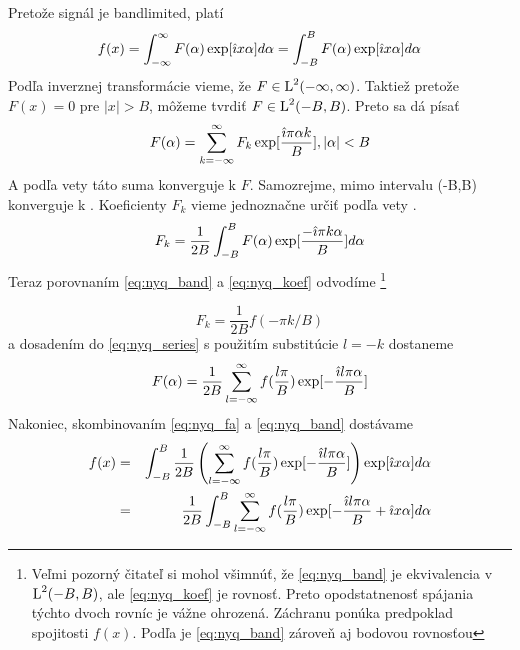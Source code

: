 \begin{dokaz}
    Pretože signál je bandlimited, platí
    \begin{equation}
        f(x) = \int_{-\infty}^{\infty} F(\alpha) \exp[ \hat{\imath} x \alpha]
        d\alpha = \int_{-B}^{B} F(\alpha) \exp[ \hat{\imath} x \alpha]
        d\alpha
        \label{eq:nyq_band}
    \end{equation}
    Podľa inverznej transformácie vieme, že $F \in \mbox{L}^2(-\infty,\infty)$. Taktiež
    pretože $F(x) = 0$ pre $|x| > B$, môžeme tvrdiť $F \in \mbox{L}^2(-B,B)$.
    Preto sa dá písať    
    \begin{equation}
        F(\alpha) = \sum_{k=-\infty}^{\infty} F_k \exp[\frac{\hat{\imath} \pi
        \alpha k}{B}], |\alpha|<B
        \label{eq:nyq_series}
    \end{equation}
    A podľa vety \todo{} táto suma konverguje k $F$. 
    Samozrejme, mimo intervalu (-B,B) konverguje k .
    Koeficienty $F_k$ vieme jednoznačne určiť podľa vety \todo{}.
    \begin{equation}
        F_k = \frac{1}{2B} \int_{-B}^{B} F(\alpha) \exp[\frac{- \hat{\imath}
        \pi k \alpha}{B}] d\alpha
        \label{eq:nyq_koef}
    \end{equation}
    Teraz porovnaním \ref{eq:nyq_band} a \ref{eq:nyq_koef} odvodíme        
    \footnote{Veľmi pozorný čitateľ si mohol všimnúť, že
        \ref{eq:nyq_band} je ekvivalencia v $\mbox{L}^2(-B,B)$, ale
        \ref{eq:nyq_koef} je rovnosť. Preto
        opodstatnenosť spájania týchto dvoch rovníc je vážne ohrozená.
        Záchranu ponúka predpoklad spojitosti $f(x)$. Podľa \todo{} je
        \ref{eq:nyq_band} zároveň aj bodovou rovnosťou}
    
    \begin{equation}
        F_k = \frac{1}{2B} f(- \pi k / B)
    \end{equation}
    a dosadením do \ref{eq:nyq_series} s použitím substitúcie $l=-k$ dostaneme
    \begin{equation}
        F(\alpha) = \frac{1}{2B} \sum_{l=-\infty}^{\infty}
            f(\frac{l \pi}{B}) \exp[-\frac{\hat{\imath} l \pi \alpha}{B}]
        \label{eq:nyq_fa}
    \end{equation}
    Nakoniec, skombinovaním \ref{eq:nyq_fa} a \ref{eq:nyq_band}
    dostávame
    \begin{eqnarray}
        f(x) & = & \int_{-B}^{B} \frac{1}{2B} \left(\sum_{l=-\infty}^{\infty} 
                f(\frac{l \pi}{B}) \exp[-\frac{\hat{\imath} l \pi \alpha}{B}]
                \right)
                \exp[ \hat{\imath} x \alpha] d\alpha \\
            & = & \frac{1}{2B} \int_{-B}^{B} \sum_{l=-\infty}^{\infty} 
                f(\frac{l \pi}{B}) \exp[-\frac{\hat{\imath} l \pi \alpha}{B}
                + \hat{\imath} x \alpha] d\alpha
    \end{eqnarray}
\end{dokaz}
